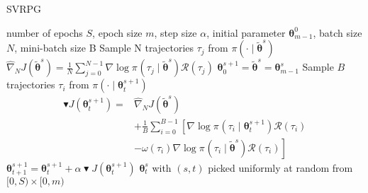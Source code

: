 \documentclass{article}
\theoremstyle{remark}
\theoremstyle{definition}
\newcommand{\vtheta}{\boldsymbol{\theta}}
\newcommand{\Reward}{\mathcal{R}}
\newcommand{\score}[2]{\nabla\log\pi_{#1}(#2)}
\newcommand{\gradApp}[2]{\hat{\nabla}_{#2}J(#1)}
\begin{document}
\begin{algorithm}[tb]
	\caption{SVRPG}
	\label{alg:svrpg}
	\begin{algorithmic}
		 number of epochs $S$, epoch size $m$, step size $\alpha$, initial parameter $\vtheta_{m-1}^0$, batch size $N$, mini-batch size B
		\STATE Sample N trajectories $\tau_j$ from $\pi(\cdot\mid\tilde{\vtheta}^{s})$
		\STATE $\gradApp{\tilde{\vtheta}^{s}}{N} = \frac{1}{N}\sum_{j=0}^{N-1}\score{}{\tau_j\mid\tilde{\vtheta}^{s}}\Reward(\tau_j)$
		\STATE $\vtheta_0^{s+1} = \tilde{\vtheta}^s = \vtheta_{m-1}^s$
		\STATE Sample $B$ trajectories $\tau_i$ from 				$\pi(\cdot\mid\vtheta_t^{s+1})$
		\STATE 
		\begin{align*}
		\blacktriangledown J(\vtheta_t^{s+1}) = 
		&\gradApp{\tilde{\vtheta}^s}{N} \\
		&+\frac{1}{B}\sum_{i=0}^{B-1}\left[ 
		\score{}{\tau_i\mid\vtheta_t^{s+1}}\Reward(\tau_i)\right. \\
		&\left. - \omega(\tau_i)\score{}{\tau_i \mid \tilde{\vtheta}^{s}}\Reward(\tau_i)\right]
		\end{align*}
		\STATE $\vtheta_{t+1}^{s+1} = \vtheta_t^{s+1} + \alpha\blacktriangledown J(\vtheta_t^{s+1})$
		\ENDFOR
		\ENDFOR
		 $\vtheta_t^s$ with $(s,t)$ picked uniformly at random from $[0,S)\times[0,m)$
	\end{algorithmic}
\end{algorithm}
\end{document}
